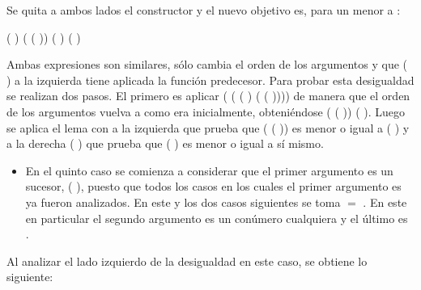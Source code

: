\begin{AgdaAlign}
Se quita a ambos lados el constructor  y el nuevo objetivo es, para un  menor a :
\begin{center}
\AgdaFunction{[}  \AgdaFunction{]}  ( ) ( ( )) \AgdaFunction{$\leq$}  ( ) ( )
\end{center}

Ambas expresiones son similares, sólo cambia el orden de los argumentos y que ( ) a la izquierda tiene aplicada la función predecesor. Para probar esta desigualdad se realizan dos pasos. El primero es aplicar (\AgdaFunction{$\sim\rightarrow\leq$} ( ( ) ( ( )))) de manera que el orden de los argumentos vuelva a como era inicialmente, obteniéndose  ( ( )) ( ). Luego se aplica el lema  con  a la izquierda que prueba que ( ( )) es menor o igual a ( ) y a la derecha  ( ) que prueba que ( ) es menor o igual a sí mismo.

\begin{itemize}
\item En el quinto caso se comienza a considerar que el primer argumento es un sucesor, ( ), puesto que todos los casos en los cuales el primer argumento es  ya fueron analizados. En este y los dos casos siguientes se toma  $=$ . En este en particular el segundo argumento es un conúmero cualquiera  y el último es .
\end{itemize}

Al analizar el lado izquierdo de la desigualdad en este caso, se obtiene lo siguiente:


\end{AgdaAlign}
